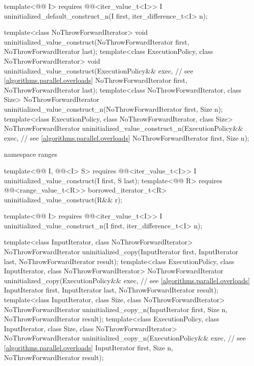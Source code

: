 \begin{codeblock}
{{    template<@@ I>
      requires @@<iter_value_t<I>>
        I uninitialized_default_construct_n(I first, iter_difference_t<I> n);
  }

  template<class NoThrowForwardIterator>
    void uninitialized_value_construct(NoThrowForwardIterator first,
                                       NoThrowForwardIterator last);
  template<class ExecutionPolicy, class NoThrowForwardIterator>
    void uninitialized_value_construct(ExecutionPolicy&& exec,  // see \ref{algorithms.parallel.overloads}
                                       NoThrowForwardIterator first,
                                       NoThrowForwardIterator last);
  template<class NoThrowForwardIterator, class Size>
    NoThrowForwardIterator
      uninitialized_value_construct_n(NoThrowForwardIterator first, Size n);
  template<class ExecutionPolicy, class NoThrowForwardIterator, class Size>
    NoThrowForwardIterator
      uninitialized_value_construct_n(ExecutionPolicy&& exec,   // see \ref{algorithms.parallel.overloads}
                                      NoThrowForwardIterator first, Size n);

  namespace ranges {
    template<@@ I, @@<I> S>
      requires @@<iter_value_t<I>>
        I uninitialized_value_construct(I first, S last);
    template<@@ R>
      requires @@<range_value_t<R>>
        borrowed_iterator_t<R> uninitialized_value_construct(R&& r);

    template<@@ I>
      requires @@<iter_value_t<I>>
        I uninitialized_value_construct_n(I first, iter_difference_t<I> n);
  }

  template<class InputIterator, class NoThrowForwardIterator>
    NoThrowForwardIterator uninitialized_copy(InputIterator first, InputIterator last,
                                              NoThrowForwardIterator result);
  template<class ExecutionPolicy, class InputIterator, class NoThrowForwardIterator>
    NoThrowForwardIterator uninitialized_copy(ExecutionPolicy&& exec,   // see \ref{algorithms.parallel.overloads}
                                              InputIterator first, InputIterator last,
                                              NoThrowForwardIterator result);
  template<class InputIterator, class Size, class NoThrowForwardIterator>
    NoThrowForwardIterator uninitialized_copy_n(InputIterator first, Size n,
                                                NoThrowForwardIterator result);
  template<class ExecutionPolicy, class InputIterator, class Size, class NoThrowForwardIterator>
    NoThrowForwardIterator uninitialized_copy_n(ExecutionPolicy&& exec, // see \ref{algorithms.parallel.overloads}
                                                InputIterator first, Size n,
                                                NoThrowForwardIterator result);

}
\end{codeblock}
